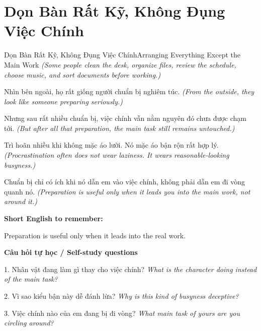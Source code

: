 \section{Dọn Bàn Rất Kỹ, Không Đụng Việc Chính}
\begin{truyen}{Dọn Bàn Rất Kỹ, Không Đụng Việc Chính}{Arranging Everything Except the Main Work}
\textit{(Some people clean the desk, organize files, review the schedule, choose music, and sort documents before working.)}

Nhìn bên ngoài, họ rất giống người chuẩn bị nghiêm túc.
\textit{(From the outside, they look like someone preparing seriously.)}

Nhưng sau rất nhiều chuẩn bị, việc chính vẫn nằm nguyên đó chưa được chạm tới.
\textit{(But after all that preparation, the main task still remains untouched.)}

Trì hoãn nhiều khi không mặc áo lười. Nó mặc áo bận rộn rất hợp lý.
\textit{(Procrastination often does not wear laziness. It wears reasonable-looking busyness.)}

\end{truyen}

\begin{baihoc}
Chuẩn bị chỉ có ích khi nó dẫn em vào việc chính, không phải dẫn em đi vòng quanh nó.
\textit{(Preparation is useful only when it leads you into the main work, not around it.)}
\end{baihoc}

\begin{ghinhoanh}
\textbf{Short English to remember:}

Preparation is useful only when it leads into the real work.

\end{ghinhoanh}

\begin{tuhocnhanh}
\textbf{Câu hỏi tự học / Self-study questions}

1. Nhân vật đang làm gì thay cho việc chính? \textit{What is the character doing instead of the main task?}

2. Vì sao kiểu bận này dễ đánh lừa? \textit{Why is this kind of busyness deceptive?}

3. Việc chính nào của em đang bị đi vòng? \textit{What main task of yours are you circling around?}
\end{tuhocnhanh}
\ngancach

